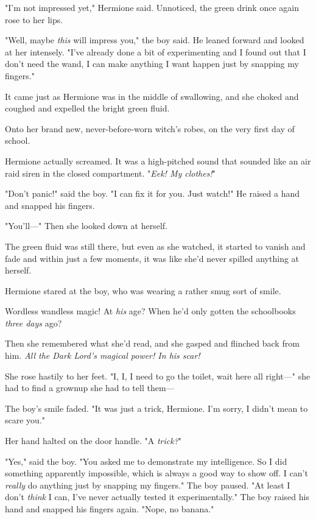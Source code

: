 "I'm not impressed yet," Hermione said. Unnoticed, the green drink once again
rose to her lips.

"Well, maybe \emph{this} will impress you," the boy said. He leaned forward and
looked at her intensely. "I've already done a bit of experimenting and I found
out that I don't need the wand, I can make anything I want happen just by
snapping my fingers."

It came just as Hermione was in the middle of swallowing, and she choked and
coughed and expelled the bright green fluid.

Onto her brand new, never-before-worn witch's robes, on the very first day of school.

Hermione actually screamed. It was a high-pitched sound that sounded like an
air raid siren in the closed compartment. "\emph{Eek! My clothes!}"

"Don't panic!" said the boy. "I can fix it for you. Just watch!" He raised a
hand and snapped his fingers.

"You'll---" Then she looked down at herself.

The green fluid was still there, but even as she watched, it started to vanish
and fade and within just a few moments, it was like she'd never spilled
anything at herself.

Hermione stared at the boy, who was wearing a rather smug sort of smile.

Wordless wandless magic! At \emph{his} age? When he'd only gotten the
schoolbooks \emph{three days} ago?

Then she remembered what she'd read, and she gasped and flinched back from him.
\emph{All the Dark Lord's magical power! In his scar!}

She rose hastily to her feet. "I, I, I need to go the toilet, wait here all
right---" she had to find a grownup she had to tell them---

The boy's smile faded. "It was just a trick, Hermione. I'm sorry, I didn't mean
to scare you."

Her hand halted on the door handle. "A \emph{trick?}"

"Yes," said the boy. "You asked me to demonstrate my intelligence. So I did
something apparently impossible, which is always a good way to show off. I
can't \emph{really} do anything just by snapping my fingers." The boy paused.
"At least I don't \emph{think} I can, I've never actually tested it
experimentally." The boy raised his hand and snapped his fingers again. "Nope,
no banana."

